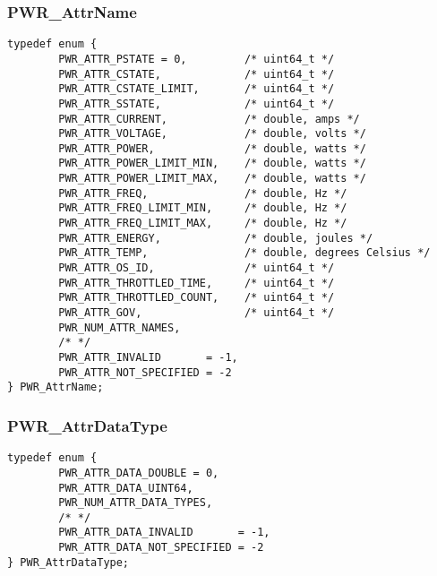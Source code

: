 \subsubsection{PWR_AttrName}\label{type:AttrName}
\begin{center}
\begin{minipage}{.95\linewidth}%
\begin{lstlisting}
typedef enum {
        PWR_ATTR_PSTATE = 0,         /* uint64_t */
        PWR_ATTR_CSTATE,             /* uint64_t */
        PWR_ATTR_CSTATE_LIMIT,       /* uint64_t */
        PWR_ATTR_SSTATE,             /* uint64_t */
        PWR_ATTR_CURRENT,            /* double, amps */
        PWR_ATTR_VOLTAGE,            /* double, volts */
        PWR_ATTR_POWER,              /* double, watts */
        PWR_ATTR_POWER_LIMIT_MIN,    /* double, watts */
        PWR_ATTR_POWER_LIMIT_MAX,    /* double, watts */
        PWR_ATTR_FREQ,               /* double, Hz */
        PWR_ATTR_FREQ_LIMIT_MIN,     /* double, Hz */
        PWR_ATTR_FREQ_LIMIT_MAX,     /* double, Hz */
        PWR_ATTR_ENERGY,             /* double, joules */
        PWR_ATTR_TEMP,               /* double, degrees Celsius */
        PWR_ATTR_OS_ID,              /* uint64_t */
        PWR_ATTR_THROTTLED_TIME,     /* uint64_t */
        PWR_ATTR_THROTTLED_COUNT,    /* uint64_t */
        PWR_ATTR_GOV,                /* uint64_t */
        PWR_NUM_ATTR_NAMES,
        /* */
        PWR_ATTR_INVALID       = -1,
        PWR_ATTR_NOT_SPECIFIED = -2
} PWR_AttrName;
\end{lstlisting}
\end{minipage}
\end{center}


\subsubsection{PWR_AttrDataType}\label{type:AttrDataType}
\begin{center}
\begin{minipage}{.95\linewidth}%
\begin{lstlisting}
typedef enum {
        PWR_ATTR_DATA_DOUBLE = 0,
        PWR_ATTR_DATA_UINT64,
        PWR_NUM_ATTR_DATA_TYPES,
        /* */
        PWR_ATTR_DATA_INVALID       = -1,
        PWR_ATTR_DATA_NOT_SPECIFIED = -2
} PWR_AttrDataType;
\end{lstlisting}
\end{minipage}
\end{center}

